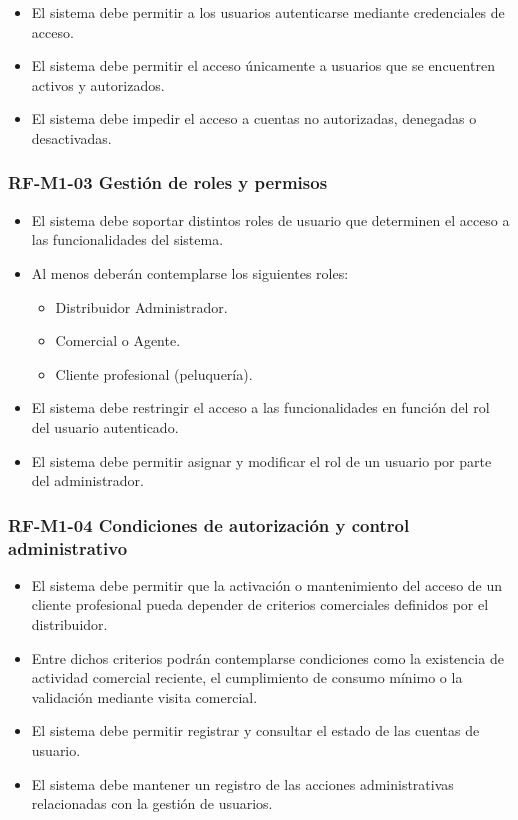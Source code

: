\begin{itemize}
    \item El sistema debe permitir a los usuarios autenticarse mediante credenciales de acceso.
    \item El sistema debe permitir el acceso únicamente a usuarios que se encuentren activos y autorizados.
    \item El sistema debe impedir el acceso a cuentas no autorizadas, denegadas o desactivadas.
\end{itemize}

\vspace{-0.75em}
\subsubsection{RF-M1-03 Gestión de roles y permisos}
\vspace{-1em}

\begin{itemize}
    \item El sistema debe soportar distintos roles de usuario que determinen el acceso a las funcionalidades del sistema.
    \item Al menos deberán contemplarse los siguientes roles:
          \begin{itemize}
              \item Distribuidor Administrador.
              \item Comercial o Agente.
              \item Cliente profesional (peluquería).
          \end{itemize}
    \item El sistema debe restringir el acceso a las funcionalidades en función del rol del usuario autenticado.
    \item El sistema debe permitir asignar y modificar el rol de un usuario por parte del administrador.
\end{itemize}

\vspace{-0.75em}
\subsubsection{RF-M1-04 Condiciones de autorización y control administrativo}
\vspace{-1em}

\begin{itemize}
    \item El sistema debe permitir que la activación o mantenimiento del acceso de un cliente profesional pueda depender de criterios comerciales definidos por el distribuidor.
    \item Entre dichos criterios podrán contemplarse condiciones como la existencia de actividad comercial reciente, el cumplimiento de consumo mínimo o la validación mediante visita comercial.
    \item El sistema debe permitir registrar y consultar el estado de las cuentas de usuario.
    \item El sistema debe mantener un registro de las acciones administrativas relacionadas con la gestión de usuarios.
\end{itemize}

